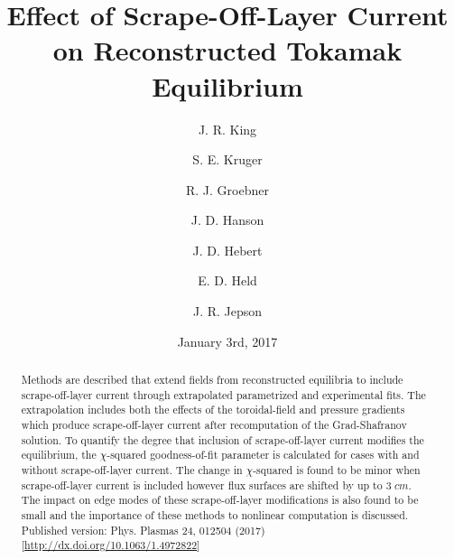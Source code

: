 \documentclass[english,aps,superscriptaddress,showkeys,showpacs,prepri,twocolumn]{revtex4}
\begin{document}
\title{Effect of Scrape-Off-Layer Current on Reconstructed Tokamak 
Equilibrium}


\author{J. R. King}

\author{S. E. Kruger}

\author{R. J. Groebner}

\author{J. D. Hanson}

\author{J. D. Hebert}

\author{E. D. Held}

\author{J. R. Jepson}


\date{January 3rd, 2017}
\begin{abstract}
Methods are described that extend fields from reconstructed equilibria to include
scrape-off-layer current through extrapolated parametrized and experimental
fits. The extrapolation includes both the effects of the toroidal-field and
pressure gradients which produce scrape-off-layer current after recomputation
of the Grad-Shafranov solution. To quantify the degree that inclusion of
scrape-off-layer current modifies the equilibrium, the
$\chi$-squared goodness-of-fit parameter is calculated for cases with and
without scrape-off-layer current. The change in $\chi$-squared is found to be
minor when scrape-off-layer current is included however flux surfaces are 
shifted by up to $3\;cm$. The impact on edge modes of
these scrape-off-layer modifications is also found to be small and the
importance of these methods to nonlinear computation is discussed.
Published version: Phys. Plasmas 24, 012504 (2017) [\url{http://dx.doi.org/10.1063/1.4972822}]
\end{abstract}

\end{document}
